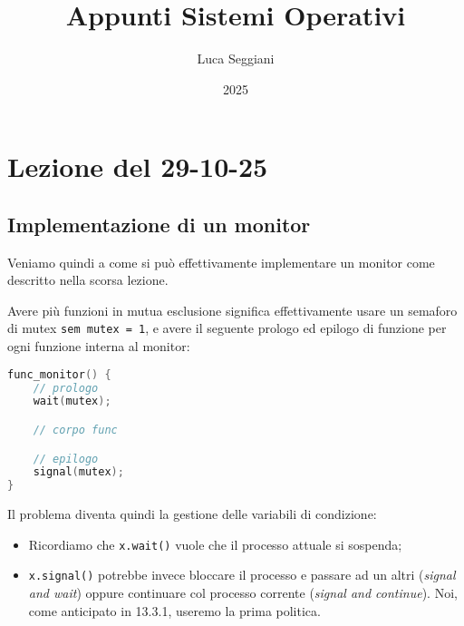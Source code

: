 \documentclass[a4paper,11pt]{article}
\title{Appunti Sistemi Operativi}
\author{Luca Seggiani}
\date{2025}
\begin{document}
\section{Lezione del 29-10-25}

\thispagestyle{empty}
\pagestyle{fancy}

\subsection{Implementazione di un monitor}
Veniamo quindi a come si può effettivamente implementare un monitor come descritto nella scorsa lezione.

Avere più funzioni in mutua esclusione significa effettivamente usare un semaforo di mutex \lstinline|sem mutex = 1|, e avere il seguente prologo ed epilogo di funzione per ogni funzione interna al monitor:
\begin{lstlisting}[language=C++, style=codestyle]	
func_monitor() {
	// prologo
	wait(mutex);

	// corpo func

	// epilogo
	signal(mutex);
}
\end{lstlisting}

Il problema diventa quindi la gestione delle variabili di condizione:
\begin{itemize}
	\item Ricordiamo che \lstinline|x.wait()| vuole che il processo attuale si sospenda;
	\item \lstinline|x.signal()| potrebbe invece bloccare il processo e passare ad un altri (\textit{signal and wait}) oppure continuare col processo corrente (\textit{signal and continue}). Noi, come anticipato in 13.3.1, useremo la prima politica.  
\end{itemize}
\end{document}
